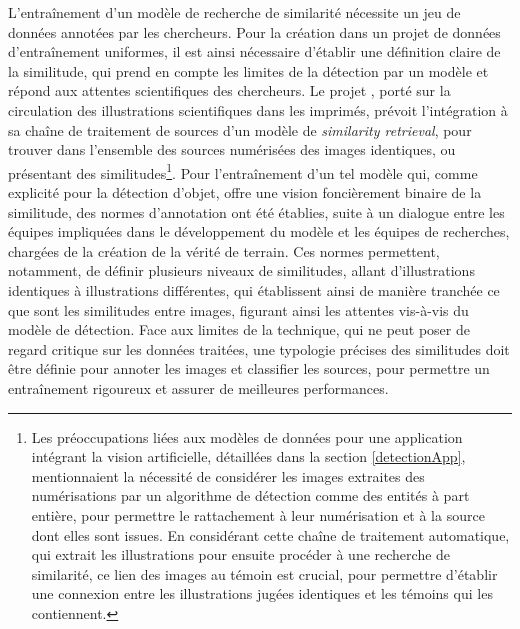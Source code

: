 	L'entraînement d'un modèle de recherche de similarité nécessite un jeu de données annotées par les chercheurs. Pour la création dans un projet de données d'entraînement uniformes, il est ainsi nécessaire d'établir une définition claire de la similitude, qui prend en compte les limites de la détection par un modèle et répond aux attentes scientifiques des chercheurs. Le projet \vhs, porté sur la circulation des illustrations scientifiques dans les imprimés, prévoit l'intégration à sa chaîne de traitement de sources d'un modèle de \textit{similarity retrieval}, pour trouver dans l'ensemble des sources numérisées des images identiques, ou présentant des similitudes\footnote{Les préoccupations liées aux modèles de données pour une application intégrant la vision artificielle, détaillées dans la section \ref{detectionApp}, mentionnaient la nécessité de considérer les images extraites des numérisations par un algorithme de détection comme des entités à part entière, pour permettre le rattachement à leur numérisation et à la source dont elles sont issues. En considérant cette chaîne de traitement automatique, qui extrait les illustrations pour ensuite procéder à une recherche de similarité, ce lien des images au témoin est crucial, pour permettre d'établir une connexion entre les illustrations jugées identiques et les témoins qui les contiennent.}. Pour l'entraînement d'un tel modèle qui, comme explicité pour la détection d'objet, offre une vision foncièrement binaire de la similitude, des normes d'annotation ont été établies, suite à un dialogue entre les équipes impliquées dans le développement du modèle et les équipes de recherches, chargées de la création de la vérité de terrain. Ces normes permettent, notamment, de définir plusieurs niveaux de similitudes, allant d'illustrations identiques à illustrations différentes, qui établissent ainsi de manière tranchée ce que sont les similitudes entre images, figurant ainsi les attentes vis-à-vis du modèle de détection. Face aux limites de la technique, qui ne peut poser de regard critique sur les données traitées, une typologie précises des similitudes doit être définie pour annoter les images et classifier les sources, pour permettre un entraînement rigoureux et assurer de meilleures performances.
	
